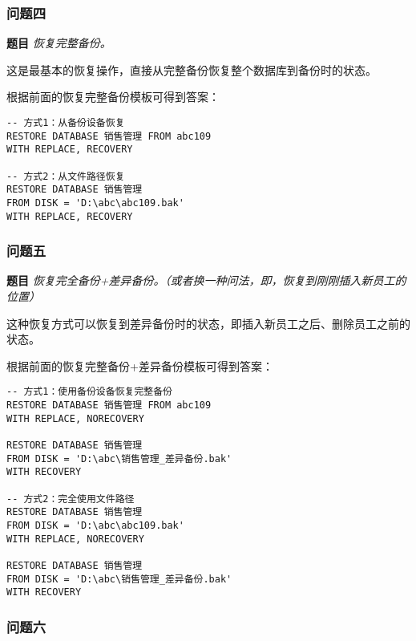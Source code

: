 \subsubsection{问题四}

\textbf{题目} \emph{恢复完整备份。}

\qquad 这是最基本的恢复操作，直接从完整备份恢复整个数据库到备份时的状态。

\qquad 根据前面的恢复完整备份模板可得到答案：

\begin{mdframed}[backgroundcolor=blue!5]
\begin{verbatim}
-- 方式1：从备份设备恢复
RESTORE DATABASE 销售管理 FROM abc109
WITH REPLACE, RECOVERY

-- 方式2：从文件路径恢复
RESTORE DATABASE 销售管理
FROM DISK = 'D:\abc\abc109.bak'
WITH REPLACE, RECOVERY
\end{verbatim}
\end{mdframed}

\subsubsection{问题五}

\textbf{题目} \emph{恢复完全备份+差异备份。（或者换一种问法，即，恢复到刚刚插入新员工的位置）}

\qquad 这种恢复方式可以恢复到差异备份时的状态，即插入新员工之后、删除员工之前的状态。

\qquad 根据前面的恢复完整备份+差异备份模板可得到答案：

\begin{mdframed}[backgroundcolor=blue!5]
\begin{verbatim}
-- 方式1：使用备份设备恢复完整备份
RESTORE DATABASE 销售管理 FROM abc109
WITH REPLACE, NORECOVERY

RESTORE DATABASE 销售管理
FROM DISK = 'D:\abc\销售管理_差异备份.bak'
WITH RECOVERY

-- 方式2：完全使用文件路径
RESTORE DATABASE 销售管理
FROM DISK = 'D:\abc\abc109.bak'
WITH REPLACE, NORECOVERY

RESTORE DATABASE 销售管理
FROM DISK = 'D:\abc\销售管理_差异备份.bak'
WITH RECOVERY
\end{verbatim}
\end{mdframed}

\subsubsection{问题六}

